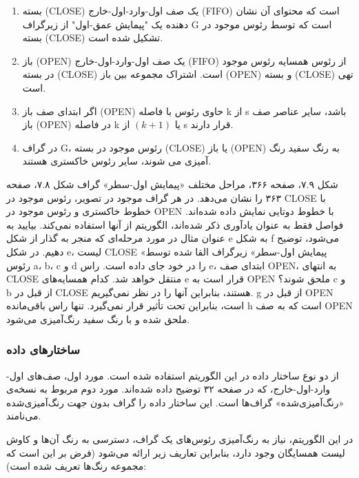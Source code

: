 \documentclass{book} %
\begin{document}
\begin{enumerate}
    \item  بسته (CLOSE) یک صف اول-وارد-اول-خارج (FIFO) است که محتوای آن نشان دهنده یک "پیمایش عمق-اول" از زیرگراف G است که توسط رئوس موجود در بسته (CLOSE) تشکیل شده است.
    
    \item  باز (OPEN) یک صف اول-وارد-اول-خارج (FIFO) از رئوس همسایه رئوس موجود در بسته (CLOSE) است. اشتراک مجموعه بین باز (OPEN) و بسته (CLOSE) تهی است.

    \item اگر ابتدای صف باز (OPEN) حاوی رئوس با فاصله k از s باشد، سایر عناصر صف باز (OPEN) در فاصله k یا $(k + 1)$ از s قرار دارند.

    \item در گراف G، رئوس موجود در بسته (CLOSE) یا باز (OPEN) به رنگ سفید رنگ آمیزی می شوند، سایر رئوس خاکستری هستند.
\end{enumerate}
\newpage

شکل ۷.۹، صفحه ۳۶۶، مراحل مختلف «پیمایش اول-سطر» گراف شکل ۷.۸، صفحه ۳۶۳ را نشان می‌دهد. در هر گراف موجود در تصویر، رئوس موجود در CLOSE با خطوط خاکستری و رئوس موجود در OPEN با خطوط دوتایی نمایش داده شده‌اند. فواصل فقط به عنوان یادآوری ذکر شده‌اند، الگوریتم از آنها استفاده نمی‌کند. بیایید به عنوان مثال در مورد مرحله‌ای که منجر به گذار از شکل e به شکل f می‌شود، توضیح دهیم. در شکل e، لیست CLOSE «پیمایش اول-سطر» زیرگراف القا شده توسط رئوس a، b، c و d را در خود جای داده است. راس e، ابتدای صف OPEN، به انتهای CLOSE منتقل خواهد شد. کدام همسایه‌های e قرار است به OPEN ملحق شوند؟ c و b از قبل در CLOSE هستند، بنابراین آنها را در نظر نمی‌گیریم. g از قبل در OPEN است، بنابراین تحت تأثیر قرار نمی‌گیرد. تنها راس باقی‌مانده h است که به صف OPEN ملحق شده و با رنگ سفید رنگ‌آمیزی می‌شود.

\subsubsection*{ساختارهای داده}

از دو نوع ساختار داده در این الگوریتم استفاده شده است. مورد اول، صف‌های اول-وارد-اول-خارج، که در صفحه ۳۲ توضیح داده شده‌اند. مورد دوم مربوط به نسخه‌ی «رنگ‌آمیزی‌شده» گراف‌ها است.
این ساختار داده را گراف بدون جهت رنگ‌آمیزی‌شده می‌نامند.

در این الگوریتم، نیاز به رنگ‌آمیزی رئوس‌های یک گراف، دسترسی به رنگ آن‌ها و کاوش لیست همسایگان وجود دارد، بنابراین تعاریف زیر ارائه می‌شود (فرض بر این است که مجموعه رنگ‌ها تعریف شده است):
\end{document}
